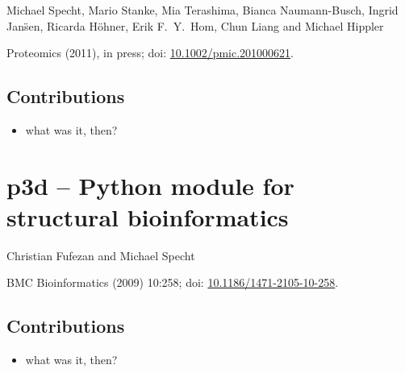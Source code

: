 Michael Specht, Mario Stanke, Mia Terashima, Bianca Naumann-Busch, Ingrid Jan\"sen, Ricarda H\"ohner, Erik F.~Y.~Hom, Chun Liang and Michael Hippler

Proteomics (2011), in press; doi: \href{http://dx.doi.org/10.1002/pmic.201000621}{10.1002/pmic.201000621}.

\label{paper:gpf}

\subsection*{Contributions}

\begin{itemize}
\item what was it, then?
\end{itemize}


% 
% 
% 

\cleardoublepage
\section{p3d -- Python module for structural bioinformatics}

Christian Fufezan and Michael Specht

BMC Bioinformatics (2009) 10:258; doi: \href{http://dx.doi.org/10.1186/1471-2105-10-258}{10.1186/1471-2105-10-258}.

\subsection*{Contributions}

\begin{itemize}
\item what was it, then?
\end{itemize}

